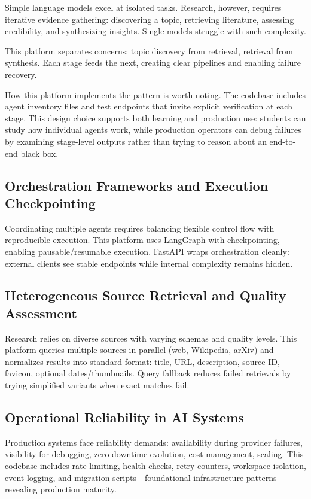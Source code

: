 \documentclass[12pt, a4paper]{article}
\begin{document}
Simple language models excel at isolated tasks. Research, however, requires iterative evidence gathering: discovering a topic, retrieving literature, assessing credibility, and synthesizing insights. Single models struggle with such complexity.

This platform separates concerns: topic discovery from retrieval, retrieval from synthesis. Each stage feeds the next, creating clear pipelines and enabling failure recovery.

How this platform implements the pattern is worth noting. The codebase includes agent
inventory files and test endpoints that invite explicit verification at each stage. This
design choice supports both learning and production use: students can study how individual
agents work, while production operators can debug failures by examining stage-level outputs
rather than trying to reason about an end-to-end black box.

\subsection{Orchestration Frameworks and Execution Checkpointing}

Coordinating multiple agents requires balancing flexible control flow with reproducible execution. This platform uses LangGraph with checkpointing, enabling pausable/resumable execution. FastAPI wraps orchestration cleanly: external clients see stable endpoints while internal complexity remains hidden.

\subsection{Heterogeneous Source Retrieval and Quality Assessment}

Research relies on diverse sources with varying schemas and quality levels. This platform queries multiple sources in parallel (web, Wikipedia, arXiv) and normalizes results into standard format: title, URL, description, source ID, favicon, optional dates/thumbnails. Query fallback reduces failed retrievals by trying simplified variants when exact matches fail.

\subsection{Operational Reliability in AI Systems}

Production systems face reliability demands: availability during provider failures, visibility for debugging, zero-downtime evolution, cost management, scaling. This codebase includes rate limiting, health checks, retry counters, workspace isolation, event logging, and migration scripts—foundational infrastructure patterns revealing production maturity.
\end{document}
